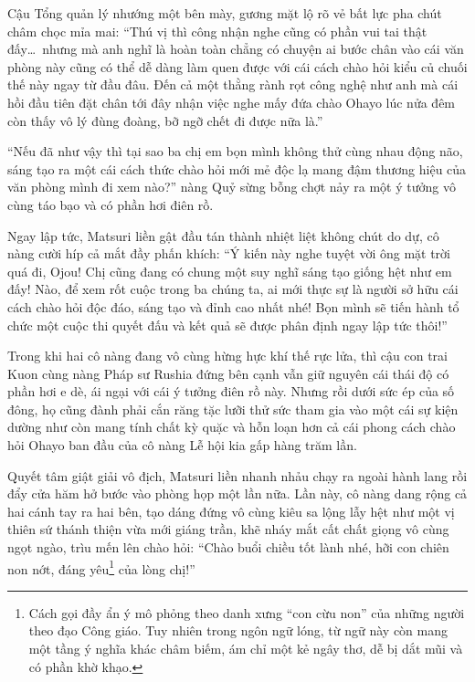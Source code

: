 \documentclass[../main.tex]{subfiles}
\begin{document}
Cậu Tổng quản lý nhướng một bên mày, gương mặt lộ rõ vẻ bất lực pha chút châm chọc mỉa mai: ``Thú vị thì công nhận nghe cũng có phần vui tai thật đấy\dots\ nhưng mà anh nghĩ là hoàn toàn chẳng có chuyện ai bước chân vào cái văn phòng này cũng có thể dễ dàng làm quen được với cái cách chào hỏi kiểu củ chuối thế này ngay từ đầu đâu. Đến cả một thằng rành rọt công nghệ như anh mà cái hồi đầu tiên đặt chân tới đây nhận việc nghe mấy đứa chào Ohayo lúc nửa đêm còn thấy vô lý đùng đoàng, bỡ ngỡ chết đi được nữa là.''

``Nếu đã như vậy thì tại sao ba chị em bọn mình không thử cùng nhau động não, sáng tạo ra một cái cách thức chào hỏi mới mẻ độc lạ mang đậm thương hiệu của văn phòng mình đi xem nào?'' nàng Quỷ sừng bỗng chợt nảy ra một ý tưởng vô cùng táo bạo và có phần hơi điên rồ.

Ngay lập tức, Matsuri liền gật đầu tán thành nhiệt liệt không chút do dự, cô nàng cười híp cả mắt đầy phấn khích: ``Ý kiến này nghe tuyệt vời ông mặt trời quá đi, Ojou! Chị cũng đang có chung một suy nghĩ sáng tạo giống hệt như em đấy! Nào, để xem rốt cuộc trong ba chúng ta, ai mới thực sự là người sở hữu cái cách chào hỏi độc đáo, sáng tạo và đỉnh cao nhất nhé! Bọn mình sẽ tiến hành tổ chức một cuộc thi quyết đấu và kết quả sẽ được phân định ngay lập tức thôi!''

Trong khi hai cô nàng đang vô cùng hừng hực khí thế rực lửa, thì cậu con trai Kuon cùng nàng Pháp sư Rushia đứng bên cạnh vẫn giữ nguyên cái thái độ có phần hơi e dè, ái ngại với cái ý tưởng điên rồ này. Nhưng rồi dưới sức ép của số đông, họ cũng đành phải cắn răng tặc lưỡi thử sức tham gia vào một cái sự kiện dường như còn mang tính chất kỳ quặc và hỗn loạn hơn cả cái phong cách chào hỏi Ohayo ban đầu của cô nàng Lễ hội kia gấp hàng trăm lần.

\ct

Quyết tâm giật giải vô địch, Matsuri liền nhanh nhảu chạy ra ngoài hành lang rồi đẩy cửa hăm hở bước vào phòng họp một lần nữa. Lần này, cô nàng dang rộng cả hai cánh tay ra hai bên, tạo dáng đứng vô cùng kiêu sa lộng lẫy hệt như một vị thiên sứ thánh thiện vừa mới giáng trần, khẽ nháy mắt cất chất giọng vô cùng ngọt ngào, trìu mến lên chào hỏi: ``Chào buổi chiều tốt lành nhé, hỡi con chiên non nớt, đáng yêu\footnote{Cách gọi đầy ẩn ý mô phỏng theo danh xưng ``con cừu non'' của những người theo đạo Công giáo. Tuy nhiên trong ngôn ngữ lóng, từ ngữ này còn mang một tầng ý nghĩa khác châm biếm, ám chỉ một kẻ ngây thơ, dễ bị dắt mũi và có phần khờ khạo.} của lòng chị!''
\end{document}
